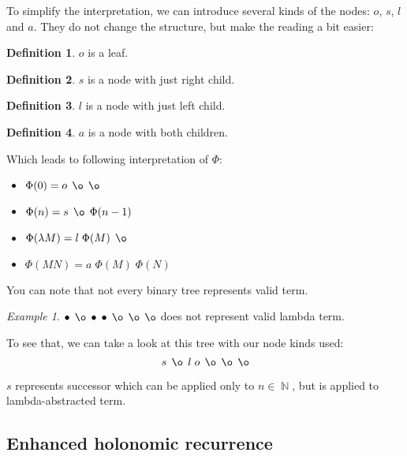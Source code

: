 \documentclass[final]{article}
\theoremstyle{definition}
\newtheorem{definition}{Definition}[subsection]
\theoremstyle{remark}
\newtheorem{example}{Example}[subsection]
\DeclareMathOperator{\N}{\mathbb{N}}
\DeclareMathOperator{\n}{\bullet}
\DeclareMathOperator{\no}{\o}
\begin{document}
To simplify the interpretation, we can introduce several kinds of the nodes: \(o\), \(s\), \(l\) and \(a\). They do not change the structure, but make the reading a bit easier:

\begin{definition}
    \(o\) is a leaf.
\end{definition}

\begin{definition}
    \(s\) is a node with just right child.
\end{definition}

\begin{definition}
    \(l\) is a node with just left child.
\end{definition}

\begin{definition}
    \(a\) is a node with both children.
\end{definition}

Which leads to following interpretation of \(\Phi\):

\begin{itemize}
    \item \(\Phi(0) = o\; \no\; \no\)
    \item \(\Phi(n) = s\; \no\; \Phi(n - 1)\)
    \item \(\Phi(\lambda M) = l\; \Phi(M)\; \no\)
    \item \(\Phi(M N) = a\; \Phi(M)\; \Phi(N)\)
\end{itemize}

You can note that not every binary tree represents valid term.

\begin{example}
    \(\n\; \no\; \n\; \n\; \no\; \no\; \no\) does not represent valid lambda term.
\end{example}

To see that, we can take a look at this tree with our node kinds used:
    \[s\; \no\; l\; o\; \no\; \no\; \no\]

\(s\) represents successor which can be applied only to \(n \in \N\), but is applied to lambda-abstracted term.

\subsection{Enhanced holonomic recurrence}%
\label{sub:enhanced_holonomic_reccurence}
\end{document}
